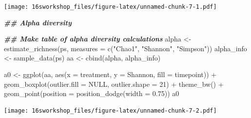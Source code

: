 \documentclass[
]{book}
\newenvironment{Shaded}{\begin{snugshade}}{\end{snugshade}}
\newcommand{\AttributeTok}[1]{\textcolor[rgb]{0.77,0.63,0.00}{#1}}
\newcommand{\ConstantTok}[1]{\textcolor[rgb]{0.00,0.00,0.00}{#1}}
\newcommand{\DecValTok}[1]{\textcolor[rgb]{0.00,0.00,0.81}{#1}}
\newcommand{\DocumentationTok}[1]{\textcolor[rgb]{0.56,0.35,0.01}{\textbf{\textit{#1}}}}
\newcommand{\FloatTok}[1]{\textcolor[rgb]{0.00,0.00,0.81}{#1}}
\newcommand{\FunctionTok}[1]{\textcolor[rgb]{0.00,0.00,0.00}{#1}}
\newcommand{\NormalTok}[1]{#1}
\newcommand{\OtherTok}[1]{\textcolor[rgb]{0.56,0.35,0.01}{#1}}
\newcommand{\SpecialCharTok}[1]{\textcolor[rgb]{0.00,0.00,0.00}{#1}}
\newcommand{\StringTok}[1]{\textcolor[rgb]{0.31,0.60,0.02}{#1}}
\begin{document}
\texttt{[image: 16sworkshop\_files/figure-latex/unnamed-chunk-7-1.pdf]}

\begin{Shaded}
\begin{Highlighting}[]
\DocumentationTok{\#\# Alpha diversity}

\DocumentationTok{\#\# Make table of alpha diversity calculations}
\NormalTok{alpha }\OtherTok{\textless{}{-}} \FunctionTok{estimate\_richness}\NormalTok{(ps, }\AttributeTok{measures =} \FunctionTok{c}\NormalTok{(}\StringTok{"Chao1"}\NormalTok{, }\StringTok{"Shannon"}\NormalTok{, }\StringTok{"Simpson"}\NormalTok{))}
\NormalTok{alpha\_info }\OtherTok{\textless{}{-}} \FunctionTok{sample\_data}\NormalTok{(ps)}
\NormalTok{aa }\OtherTok{\textless{}{-}} \FunctionTok{cbind}\NormalTok{(alpha, alpha\_info)}


\NormalTok{a0 }\OtherTok{\textless{}{-}} \FunctionTok{ggplot}\NormalTok{(aa, }\FunctionTok{aes}\NormalTok{(}\AttributeTok{x =}\NormalTok{ treatment, }\AttributeTok{y =}\NormalTok{ Shannon, }\AttributeTok{fill =}\NormalTok{ timepoint)) }\SpecialCharTok{+}
  \FunctionTok{geom\_boxplot}\NormalTok{(}\AttributeTok{outlier.fill =} \ConstantTok{NULL}\NormalTok{, }\AttributeTok{outlier.shape =} \DecValTok{21}\NormalTok{) }\SpecialCharTok{+}
  \FunctionTok{theme\_bw}\NormalTok{() }\SpecialCharTok{+}
  \FunctionTok{geom\_point}\NormalTok{(}\AttributeTok{position =} \FunctionTok{position\_dodge}\NormalTok{(}\AttributeTok{width =} \FloatTok{0.75}\NormalTok{))}
\NormalTok{a0}
\end{Highlighting}
\end{Shaded}

\texttt{[image: 16sworkshop\_files/figure-latex/unnamed-chunk-7-2.pdf]}
\end{document}
